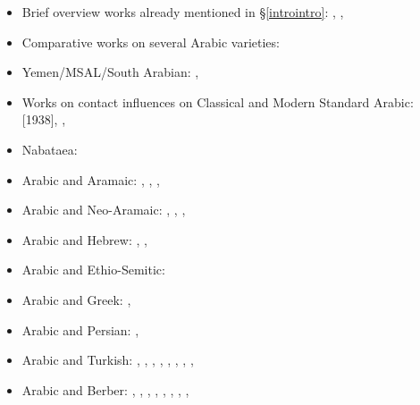 \documentclass[output=paper]{langsci/langscibook}
\begin{document}
\begin{itemize}[noitemsep]

\item[] Brief overview works already mentioned in §\ref{introintro}: \citet{Thomason2011}, \citet{Versteegh2001article,Versteegh2010}, \citet{Manfredi2018}

\item[]Comparative works on several Arabic varieties: \citet{Owens2018}

\item[]Yemen/MSAL/South Arabian: \citet{Diem1979}, \citet{Watson2018}

\item[]Works on contact influences on Classical and Modern Standard Arabic: \citet{Jeffrey2007} [1938], \citet{Blau1969}, \citet{Hebbo1984}

\item[]Nabataea: \citet{Macdonald2003}

\item[]Arabic and Aramaic: \citet{Fraenkel1886}, \citet{Stein2018}, \citet{Retsö2011}, \citet{Weninger2011Aramaic}

\item[]Arabic and Neo-Aramaic:
\citet{ArnoldBehnstedt1993} \citet{Borg2008}, \citet{Coghill2012,Coghill2015}, \citet{Jastrow2015}, \citet{Owens2016Aramaic}

\item[]Arabic and Hebrew:
\citet{Blau1981}, \citet{Nevo1999}, \citet{Yoda2013}

\item[]Arabic and Ethio-Semitic: \citet{Nöldeke1910}

\item[]Arabic and Greek: \citet{Gutas2011},

\item[]Arabic and Persian: \citet{Asbaghi2011}, \citet{Gazsi2011}

\item[]Arabic and Turkish: \citet{BenCheneb1922}, \citet{Reinkowski1995}, \citet{Procházka2002Adana,Procházka2011Turkish}, \citet{Isaksson2005}, \citet{SánchezVicente2012}, \citet{Haig2014}, \citet{Taylan2017}, \citet{AkkusBenmamoun2018}, \citet{Procházka-Eisl2018}

\item[]Arabic and Berber: \citet{Corriente1981, Corriente1998Berber,Corriente2002}, \citet{Taine-Cheikh1997Zenaga,Taine-Cheikh2008chapter,Taine-Cheikh2018quadri}, \citet{Brahimi2000}, \citet{Ameur2008},
\citet{Kossmann2009,Kossmann2010,Kossmann2013book,Kossmann2013chapter,Kossmann2014}, \citet{Souag2007,Souag2009,Souag2013book,Souag2018berber,Souag2018thing}, \citet{Lafkioui2013reinventing,Lafkioui2013bu}, \citet{Tigziri2008}, \citet{vanPuttenBenkato2017}


\end{itemize}
\end{document}
